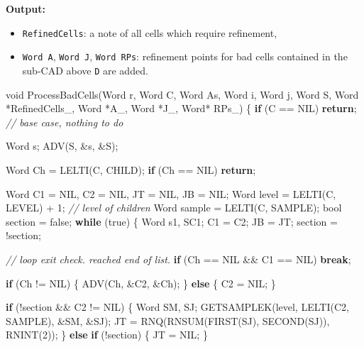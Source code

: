 \documentclass[
]{book}
\newenvironment{Shaded}{\begin{snugshade}}{\end{snugshade}}
\newcommand{\CommentTok}[1]{\textcolor[rgb]{0.56,0.35,0.01}{\textit{#1}}}
\newcommand{\ControlFlowTok}[1]{\textcolor[rgb]{0.13,0.29,0.53}{\textbf{#1}}}
\newcommand{\DataTypeTok}[1]{\textcolor[rgb]{0.13,0.29,0.53}{#1}}
\newcommand{\DecValTok}[1]{\textcolor[rgb]{0.00,0.00,0.81}{#1}}
\newcommand{\NormalTok}[1]{#1}
\providecommand{\tightlist}{%
  \setlength{\itemsep}{0pt}\setlength{\parskip}{0pt}}
\theoremstyle{definition}
\theoremstyle{definition}
\theoremstyle{definition}
\theoremstyle{definition}
\theoremstyle{remark}
\begin{document}
\textbf{Output:}

\begin{itemize}
\tightlist
\item
  \texttt{RefinedCells}: a note of all cells which require refinement,
\item
  \texttt{Word\ A}, \texttt{Word\ J}, \texttt{Word\ RPs}: refinement points for bad cells contained in the sub-CAD above \texttt{D} are added.
\end{itemize}

\begin{Shaded}
\begin{Highlighting}[numbers=left,,]
\DataTypeTok{void}\NormalTok{ ProcessBadCells(Word r, Word C, Word As, Word i, Word j, Word S, Word *RefinedCells\_, Word *A\_, Word *J\_, Word* RPs\_)}
\NormalTok{\{}
    \ControlFlowTok{if}\NormalTok{ (C == NIL) }\ControlFlowTok{return}\NormalTok{; }\CommentTok{// base case, nothing to do}

\NormalTok{    Word s;}
\NormalTok{    ADV(S, \&s, \&S);}

\NormalTok{    Word Ch = LELTI(C, CHILD);}
    \ControlFlowTok{if}\NormalTok{ (Ch == NIL) }\ControlFlowTok{return}\NormalTok{;}

\NormalTok{    Word C1 = NIL, C2 = NIL, JT = NIL, JB = NIL;}
\NormalTok{    Word level = LELTI(C, LEVEL) + }\DecValTok{1}\NormalTok{; }\CommentTok{// level of children}
\NormalTok{    Word sample = LELTI(C, SAMPLE);}
    \DataTypeTok{bool}\NormalTok{ section = false;}
    \ControlFlowTok{while}\NormalTok{ (true) \{}
\NormalTok{        Word s1, SC1;}
\NormalTok{        C1 = C2;}
\NormalTok{        JB = JT;}
\NormalTok{        section = !section;}

        \CommentTok{// loop exit check. reached end of list.}
        \ControlFlowTok{if}\NormalTok{ (Ch == NIL \&\& C1 == NIL) }\ControlFlowTok{break}\NormalTok{;}

        \ControlFlowTok{if}\NormalTok{ (Ch != NIL) \{}
\NormalTok{            ADV(Ch, \&C2, \&Ch);}
\NormalTok{        \} }\ControlFlowTok{else}\NormalTok{ \{}
\NormalTok{            C2 = NIL;}
\NormalTok{        \}}

        \ControlFlowTok{if}\NormalTok{ (!section \&\& C2 != NIL) \{}
\NormalTok{            Word SM, SJ;}
\NormalTok{            GETSAMPLEK(level, LELTI(C2, SAMPLE), \&SM, \&SJ);}
\NormalTok{            JT = RNQ(RNSUM(FIRST(SJ), SECOND(SJ)), RNINT(}\DecValTok{2}\NormalTok{));}
\NormalTok{        \} }\ControlFlowTok{else} \ControlFlowTok{if}\NormalTok{ (!section) \{}
\NormalTok{            JT = NIL;}
\NormalTok{        \}}


\end{Highlighting}
\end{Shaded}
\end{document}
